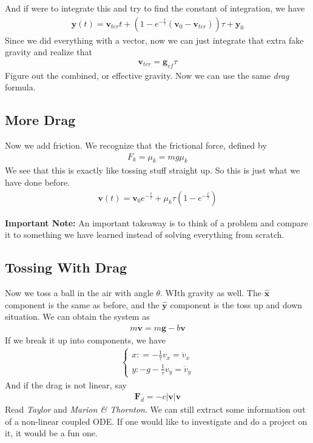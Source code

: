 \documentclass[12pt]{article}
\newcommand{\paren}[1]{\left( #1 \right)}
\newcommand{\abso}[1]{\left|#1 \right|}
\newcommand{\unx}{\hat{\mathbf{x}}}
\newcommand{\uny}{\hat{\mathbf{y}}}
\begin{document}
And if were to integrate this and try to find the constant of integration, we have
\begin{align}
\mathbf{y}(t) = \mathbf{v}_{ter}t + \paren{1-e^{-\frac{t}{\tau}}\paren{\mathbf{v}_{0}-\mathbf{v}_{ter}}}\tau + \mathbf{y}_0
\end{align}
Since we did everything with a vector, now we can just integrate that extra fake gravity and realize that
\begin{align}
\mathbf{v}_{ter} = \mathbf{g}_{ef}\tau
\end{align}
Figure out the combined, or effective gravity. Now we can use the same \textit{drag} formula. 

\subsection{More Drag}
Now we add friction. We recognize that the frictional force, defined by
\begin{align}
F_k = \mu_k = mg\mu_k
\end{align}
We see that this is exactly like tossing stuff straight up. So this is just what we have done before.
\begin{align}
\mathbf{v}(t) = \mathbf{v}_0e^{-\frac{t}{\tau}} + \mu_k\tau\paren{1-e^{-\frac{t}{\tau}}}
\end{align}

\textbf{Important Note:} An important takeaway is to think of a problem and compare it to something we have learned instead of solving everything from scratch. 

\subsection{Tossing With Drag}
Now we toss a ball in the air with angle $\theta$. WIth gravity as well. The $\unx$ component is the same as before, and the $\uny$ component is the toss up and down situation. We can obtain the system as
\begin{align}
m\dot{\mathbf{v}} = m\mathbf{g} - b\mathbf{v}
\end{align}
If we break it up into components, we have
\begin{align}
\begin{cases}
    x\colon = -\frac{1}{\tau}v_x = \dot{v}_x\\
    y\colon -g-\frac{1}{\tau}v_y = \dot{v}_y
\end{cases}
\end{align}
And if the drag is not linear, say
\begin{align}
\mathbf{F}_d = -c\abso{\mathbf{v}}\mathbf{v}
\end{align}
Read \textit{Taylor} and \textit{Marion \& Thornton}. We can still extract some information out of a non-linear coupled ODE. If one would like to investigate and do a project on it, it would be a fun one. 
\end{document}
